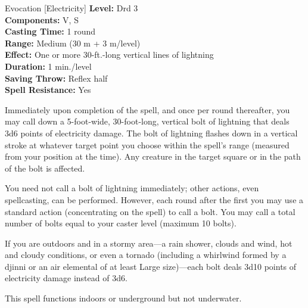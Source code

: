 {Evocation [Electricity]}
{
	\textbf{Level:}
	Drd 3\\
	\textbf{Components:}
	V, S\\
	\textbf{Casting Time:}
	1 round\\
	\textbf{Range:}
	Medium (30 m + 3 m/level)\\
	\textbf{Effect:}
	One or more 30-ft.-long vertical lines of lightning\\
	\textbf{Duration:}
	1 min./level\\
	\textbf{Saving Throw:}
	Reflex half\\
	\textbf{Spell Resistance:}
	Yes\\
}
{
	Immediately upon completion of the spell, and once per round thereafter, you may call down a 5-foot-wide, 30-foot-long, vertical bolt of lightning that deals 3d6 points of electricity damage. The bolt of lightning flashes down in a vertical stroke at whatever target point you choose within the spell's range (measured from your position at the time). Any creature in the target square or in the path of the bolt is affected.

	You need not call a bolt of lightning immediately; other actions, even spellcasting, can be performed. However, each round after the first you may use a standard action (concentrating on the spell) to call a bolt. You may call a total number of bolts equal to your caster level (maximum 10 bolts).

	If you are outdoors and in a stormy area---a rain shower, clouds and wind, hot and cloudy conditions, or even a tornado (including a whirlwind formed by a djinni or an air elemental of at least Large size)---each bolt deals 3d10 points of electricity damage instead of 3d6.

	This spell functions indoors or underground but not underwater.

}
